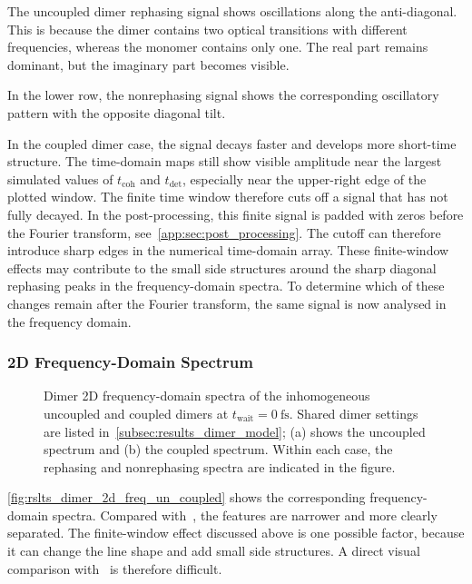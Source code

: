 The uncoupled dimer rephasing signal shows oscillations along the anti-diagonal. This is because the dimer contains two optical transitions with different frequencies, whereas the monomer contains only one. The real part remains dominant, but the imaginary part becomes visible.

In the lower row, the nonrephasing signal shows the corresponding oscillatory pattern with the opposite diagonal tilt.

In the coupled dimer case, the signal decays faster and develops more short-time structure. The time-domain maps still show visible amplitude near the largest simulated values of \(t_{\mathrm{coh}}\) and \(t_{\mathrm{det}}\), especially near the upper-right edge of the plotted window. The finite time window therefore cuts off a signal that has not fully decayed. In the post-processing, this finite signal is padded with zeros before the Fourier transform, see~\autoref{app:sec:post_processing}. The cutoff can therefore introduce sharp edges in the numerical time-domain array. These finite-window effects may contribute to the small side structures around the sharp diagonal rephasing peaks in the frequency-domain spectra.
To determine which of these changes remain after the Fourier transform, the same signal is now analysed in the frequency domain.

\subsubsection{2D Frequency-Domain Spectrum}
\begin{figure}[htbp]
    \centering
\caption{Dimer 2D frequency-domain spectra of the inhomogeneous
uncoupled and coupled dimers at
\(t_{\mathrm{wait}}=\SI{0}{\femto\second}\). Shared dimer settings are
listed in~\autoref{subsec:results_dimer_model}; (a) shows the
uncoupled spectrum and (b) the coupled spectrum.
Within each case, the rephasing and nonrephasing spectra are indicated in the
figure.}
    \label{fig:rslts_dimer_2d_freq_un_coupled}
\end{figure}

\autoref{fig:rslts_dimer_2d_freq_un_coupled} shows the corresponding frequency-domain spectra. Compared with~\cite{pisliakovetal2006twodimensionalopticalthreepulse}, the features are narrower and more clearly separated. The finite-window effect discussed above is one possible factor, because it can change the line shape and add small side structures. A direct visual comparison with~\cite{pisliakovetal2006twodimensionalopticalthreepulse} is therefore difficult.

